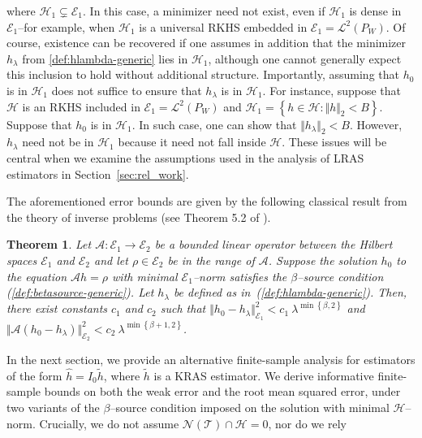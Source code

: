 \documentclass[twoside,11pt]{article}
\newtheorem{theorem}{Theorem}
\newcommand{\mc}{\mathcal}
\begin{document}
where $\mc{H}_1 \subsetneq \mc{E}_1$. In this case, a minimizer need not exist, even if $\mc{H}_1$ is dense in $\mc{E}_1$--for example, when $\mc{H}_1$ is a universal RKHS embedded in $\mc{E}_1 = \mc{L}^2(P_W)$. Of course, existence can be recovered if one assumes in addition that the minimizer $h_\lambda$ from \eqref{def:hlambda-generic} lies in $\mc{H}_1$, although one cannot generally expect this inclusion to hold without additional structure. Importantly, assuming that $h_0$ is in $\mc{H}_1$ does not suffice to ensure that $h_\lambda$ is in $\mc{H}_1$. For instance, suppose that $\mc{H}$ is an RKHS included in $\mc{E}_1 = \mc{L}^2(P_W)$ and $\mc{H}_1=\left\{h\in\mc{H}: \Vert h\Vert_2 < B \right\}$. Suppose  that $h_0$ is in $\mc{H}_1$. In such case, one can show that $\Vert h_\lambda \Vert_2 <B$. However, $h_\lambda$ need not be in $\mc{H}_1$ because it need not fall inside $\mc{H}$. These issues will be central when we examine the assumptions used in the analysis of LRAS estimators in Section~\ref{sec:rel_work}.

The aforementioned error bounds are given by the following classical result from the theory of inverse problems (see Theorem 5.2 of \cite{hohage2002lecture}). 
\begin{theorem}
    Let $\mc{A} : \mc{E}_1 \rightarrow \mc{E}_2$ be a bounded linear operator between the Hilbert spaces $\mc{E}_1$ and $\mc{E}_2$ and let $\rho \in \mc{E}_2 $ be in the range of $\mc{A}$. Suppose the solution $h_0$ to the equation $\mc{A}h=\rho$ with minimal $\mc{E}_1$--norm satisfies the $\beta$--source condition (\ref{def:betasource-generic}). Let $h_\lambda$ be defined as in~(\ref{def:hlambda-generic}). Then, there exist constants $c_1$ and $c_2$ such that $\Vert h_0 - h_{\lambda} \Vert_{\mc{E}_1}^2 < c_1 \:\lambda^{\min\left\{\beta ,2\right\}}$ and  $ \Vert \mc{A} ( h_0 - h_{\lambda}) \Vert_{\mc{E}_2}^2 < c_2 \:\lambda^{\min\left\{\beta +1 ,2\right\}}$.
    \label{thm:source-general}
\end{theorem}
In the next section, we provide an alternative finite-sample analysis for estimators of the form $\hat{h} = I_0 \tilde{h}$, where $\tilde{h}$ is a KRAS estimator. We derive informative finite-sample bounds on both the weak error and the root mean squared error, under two variants of the $\beta$--source condition imposed on the solution with minimal $\mathcal{H}$--norm. Crucially, we do not assume $\mathcal{N}(\mathcal{T}) \cap \mathcal{H} = {0}$, nor do we rely %
\end{document}
